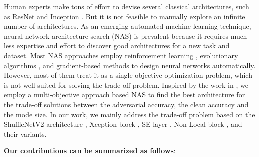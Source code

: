 \documentclass[journal]{IEEEtran}
\begin{document}
Human experts make tons of effort to devise several classical architectures, such as ResNet \cite{he:he2016deep} and Inception \cite{szegedy:szegedy2015going}. But it is not feasible to manually explore an infinite number of architectures. As an emerging automated machine learning technique, neural network architecture search (NAS) \cite{liu:liu2018darts, pham:pham2018efficient} is prevalent because it requires much less expertise and effort to discover good architectures for a new task and dataset. Most NAS approaches employ reinforcement learning \cite{zoph:zoph2018learning}, evolutionary algorithms \cite{xie:xie2017genetic}, and gradient-based methods \cite{liu:liu2018darts} to design neural networks automatically. However, most of them treat it as a single-objective optimization problem, which is not well suited for solving the trade-off problem. Inspired by the work in \cite{jin2008pareto, MRL, modulenet}, we employ a multi-objective approach based NAS to find the best architecture for the trade-off solutions between the adversarial accuracy, the clean accuracy and the mode size. In our work, we mainly address the trade-off problem based on the ShuffleNetV2 architecture \cite{ma2018shufflenet}, Xception block \cite{chollet2017xception}, SE layer \cite{hu2018squeeze},  Non-Local block \cite{wang2018non}, and their variants.

\textbf{Our contributions can be summarized as follows}:
\end{document}
